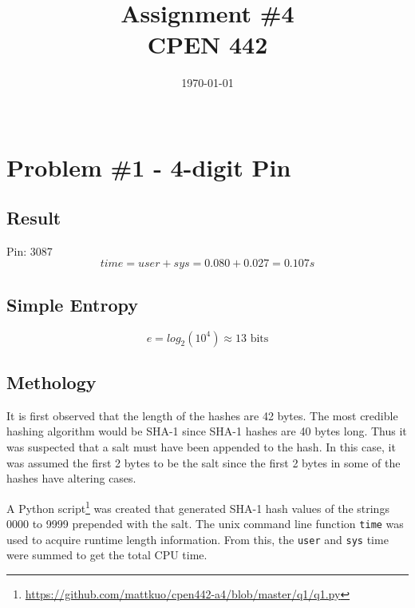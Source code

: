 \documentclass[conference]{IEEEtran}
\begin{document}
\title{Assignment \#4\\
\Large{CPEN 442\\}}


\author{
  \today\\\\
}


\maketitle


\section{Problem \#1 - 4-digit Pin}

\subsection{Result}
  \noindent Pin: 3087
  \begin{displaymath}
  time = user + sys = 0.080 + 0.027 = 0.107s
  \end{displaymath}

\subsection{Simple Entropy}
  \begin{displaymath}
    e = log_2(10^4) \approx 13 \mbox{ bits}
  \end{displaymath}

\subsection{Methology}
It is first observed that the length of the hashes are 42 bytes. The most
credible hashing algorithm would be SHA-1 since SHA-1 hashes are 40 bytes long.
Thus it was suspected that a salt must have been appended to the hash. In this
case, it was assumed the first 2 bytes to be the salt since the first 2 bytes in
some of the hashes have altering cases.

A Python
script\footnote{\url{https://github.com/mattkuo/cpen442-a4/blob/master/q1/q1.py}}
was created that generated SHA-1 hash values of the strings 0000 to 9999
prepended with the salt. The unix command line function \texttt{time} was used
to acquire runtime length information. From this, the \texttt{user} and
\texttt{sys} time were summed to get the total CPU time.
\end{document}
